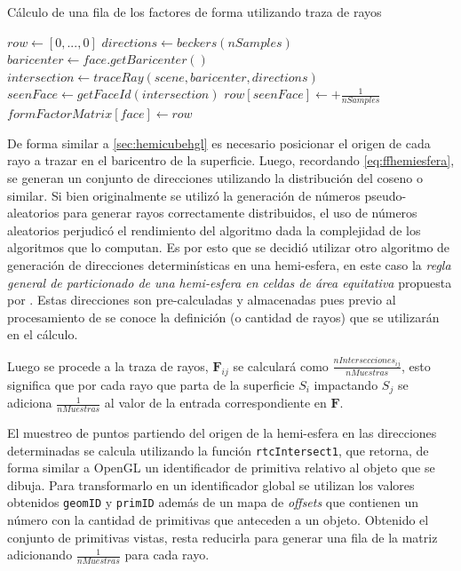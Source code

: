 \begin{algorithm}
	\caption{Cálculo de una fila de los factores de forma utilizando traza de rayos}
	\label{alg:processHemicube}
	\begin{algorithmic}
			\State $row \gets [0,...,0]$
			\State $directions \gets beckers(nSamples)$
			\State $baricenter \gets face.getBaricenter()$
			\State $intersection \gets traceRay(scene, baricenter, directions)$
			\State $seenFace \gets getFaceId(intersection)$
			\State $row[seenFace] \gets + \frac{1}{nSamples}$
			\EndIf
			\EndLoop
			\State $formFactorMatrix[face] \gets  row$
		\EndFunction
	\end{algorithmic}
\end{algorithm}

De forma similar a \ref{sec:hemicubehgl} es necesario posicionar el origen de cada rayo a trazar en el baricentro de la superficie. Luego, recordando \eqref{eq:ffhemiesfera}, se generan un conjunto de direcciones utilizando la distribución del coseno o similar. Si bien originalmente se utilizó la generación de números pseudo-aleatorios para generar rayos correctamente distribuidos, el uso de números aleatorios perjudicó el rendimiento del algoritmo dada la complejidad de los algoritmos que lo computan. Es por esto que se decidió utilizar otro algoritmo de generación de direcciones determinísticas en una hemi-esfera, en este caso la \textit{regla general de particionado de una hemi-esfera en celdas de área equitativa} propuesta por \citeauthor{Becker}. Estas direcciones son pre-calculadas y almacenadas pues previo al procesamiento de se conoce la definición (o cantidad de rayos) que se utilizarán en el cálculo.

Luego se procede a la traza de rayos, $\mathbf{F}_{ij}$ se calculará como $\frac{nIntersecciones_{ij}}{nMuestras}$, esto significa que por cada rayo que parta de la superficie $S_{i}$ impactando $S_{j}$ se adiciona $\frac{1}{nMuestras}$ al valor de la entrada correspondiente en $\mathbf{F}$.

El muestreo de puntos partiendo del origen de la hemi-esfera en las direcciones determinadas se calcula utilizando la función \verb|rtcIntersect1|, que retorna, de forma similar a OpenGL un identificador de primitiva relativo al objeto que se dibuja. Para transformarlo en un identificador global se utilizan los valores obtenidos \verb|geomID| y \verb|primID| además de un mapa de \textit{offsets} que contienen un número con la cantidad de primitivas que anteceden a un objeto. Obtenido el conjunto de primitivas vistas, resta reducirla para generar una fila de la matriz adicionando $\frac{1}{nMuestras}$ para cada rayo.

